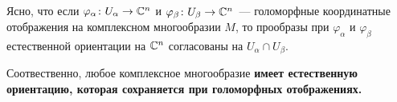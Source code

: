     Ясно, что если $\varphi_{\alpha}\colon U_{\alpha} \to \mathbb{C}^n$ и $\varphi_{\beta}\colon U_{\beta} \to \mathbb{C}^n$~--- голоморфные координатные отображения на
    комплексном многообразии $M$, то прообразы при $\varphi_{\alpha}$ и $\varphi_{\beta}$
    естественной ориентации на  $\mathbb{C}^n$ согласованы на $U_{\alpha} \cap U_{\beta}$.

    Соотвественно, любое комплексное многообразие \bf{имеет естественную ориентацию}, которая сохраняется
    при голоморфных отображениях.

